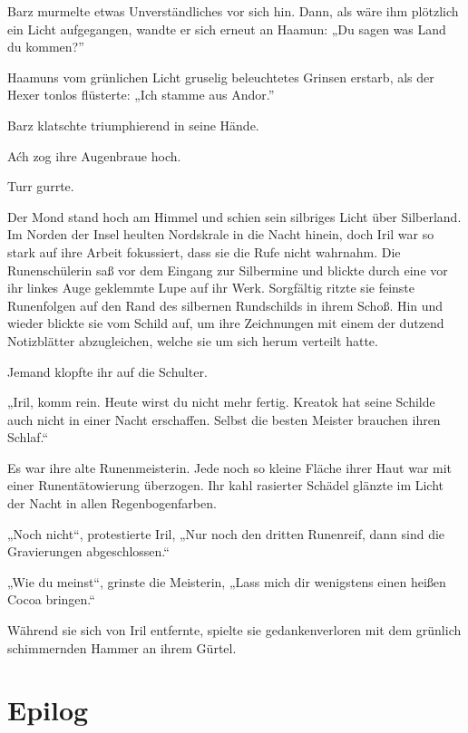 Barz murmelte etwas Unverständliches vor sich hin. Dann, als wäre ihm plötzlich ein Licht aufgegangen, wandte er sich erneut an Haamun: „Du sagen was Land du kommen?”

Haamuns vom grünlichen Licht gruselig beleuchtetes Grinsen erstarb, als der Hexer tonlos flüsterte: „Ich stamme aus Andor.”

Barz klatschte triumphierend in seine Hände.

Aćh zog ihre Augenbraue hoch.

Turr gurrte.



\trennzeichen



Der Mond stand hoch am Himmel und schien sein silbriges Licht über Silberland. Im Norden der Insel heulten Nordskrale in die Nacht hinein, doch Iril war so stark auf ihre Arbeit fokussiert, dass sie die Rufe nicht wahrnahm. Die Runenschülerin saß vor dem Eingang zur Silbermine und blickte durch eine vor ihr linkes Auge geklemmte Lupe auf ihr Werk. Sorgfältig ritzte sie feinste Runenfolgen auf den Rand des silbernen Rundschilds in ihrem Schoß. Hin und wieder blickte sie vom Schild auf, um ihre Zeichnungen mit einem der dutzend Notizblätter abzugleichen, welche sie um sich herum verteilt hatte.

Jemand klopfte ihr auf die Schulter.

„Iril, komm rein. Heute wirst du nicht mehr fertig. Kreatok hat seine Schilde auch nicht in einer Nacht erschaffen. Selbst die besten Meister brauchen ihren Schlaf.“

Es war ihre alte Runenmeisterin. Jede noch so kleine Fläche ihrer Haut war mit einer Runentätowierung überzogen. Ihr kahl rasierter Schädel glänzte im Licht der Nacht in allen Regenbogenfarben.

„Noch nicht“, protestierte Iril, „Nur noch den dritten Runenreif, dann sind die Gravierungen abgeschlossen.“

„Wie du meinst“, grinste die Meisterin, „Lass mich dir wenigstens einen heißen Cocoa bringen.“

Während sie sich von Iril entfernte, spielte sie gedankenverloren mit dem grünlich schimmernden Hammer an ihrem Gürtel.






\newpage
\section{Epilog}


